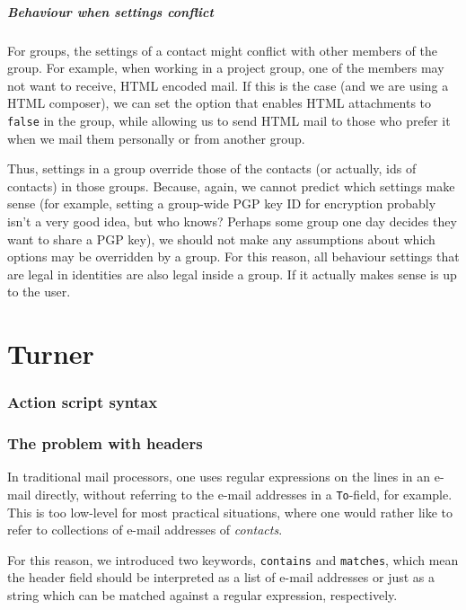 \documentclass[a4paper]{article}
\begin{document}
\subsubsection{Behaviour when settings conflict}

For groups, the settings of a contact might conflict with other members
of the group.  For example, when working in a project group, one of the
members may not want to receive, HTML encoded mail.  If this is the
case (and we are using a HTML composer), we can set the option that
enables HTML attachments to \texttt{false} in the group, while allowing
us to send HTML mail to those who prefer it when we mail them personally
or from another group.

Thus, settings in a group override those of the contacts (or actually,
ids of contacts) in those groups.  Because, again, we cannot predict
which settings make sense (for example, setting a group-wide PGP key ID for
encryption probably isn't a very good idea, but who knows?  Perhaps some
group one day decides they want to share a PGP key), we should not make any
assumptions about which options may be overridden by a group.
For this reason, all behaviour settings that are legal in identities are
also legal inside a group.  If it actually makes sense is up to the user.

\part{Turner}

\section{Action script syntax}


\section{The problem with headers}

In traditional mail processors, one uses regular expressions on the lines in an
e-mail directly, without referring to the e-mail addresses in a \texttt{To}-field,
for example.  This is too low-level for most practical situations, where one would
rather like to refer to collections of e-mail addresses of \emph{contacts}.

For this reason, we introduced two keywords, \texttt{contains} and
\texttt{matches}, which mean the header field should be interpreted as a list
of e-mail addresses or just as a string which can be matched against a regular
expression, respectively.
\end{document}
